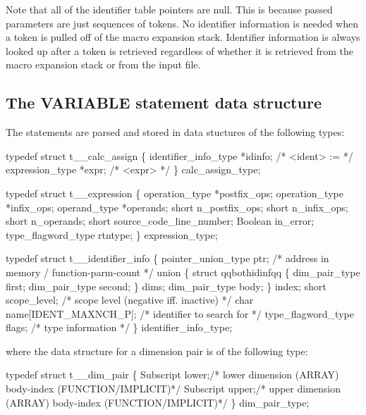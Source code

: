 Note that all of the identifier table pointers are null.  This is because
passed parameters are just sequences of tokens.   No identifier information
is needed when a token is pulled off of the macro expansion stack.
Identifier information is always looked up after a token is retrieved
regardless of whether it is retrieved from the macro expansion stack or from
the input file.


\subsection{The VARIABLE statement data structure}
\label{sec:calc}

The  statements are parsed and stored in data stuctures
of the following types:
\begin{codeexample}
typedef struct t__calc_assign
   \{
       identifier_info_type *idinfo;  /* <ident> := */
       expression_type *expr;         /*            <expr> */
   \} calc_assign_type;
\end{codeexample}

\begin{codeexample}
typedef struct t__expression
   \{
       operation_type *postfix_ops;
       operation_type *infix_ops;
       operand_type *operands;
       short n_postfix_ops;
       short n_infix_ops;
       short n_operands;
       short source_code_line_number;
       Boolean in_error;
       type_flagword_type rtntype;
   \} expression_type;
\end{codeexample}

\begin{codeexample}
typedef struct t__identifier_info
  \{
     pointer_union_type ptr;    /* address in memory / function-parm-count */
     union
        \{
           struct qqbothidinfqq
              \{
                 dim_pair_type first;
                 dim_pair_type second;
              \} dims;
           dim_pair_type body;
        \} index;
     short scope_level;         /* scope level (negative iff. inactive) */
     char name[IDENT_MAXNCH_P]; /* identifier to search for */
     type_flagword_type flags;  /* type information */
  \} identifier_info_type;
\end{codeexample}
where the data structure for a dimension pair is of the following type:
\begin{codeexample}
typedef struct t__dim_pair
  \{
    Subscript lower;/* lower dimension (ARRAY) body-index (FUNCTION/IMPLICIT)*/
    Subscript upper;/* upper dimension (ARRAY) body-index (FUNCTION/IMPLICIT)*/
  \} dim_pair_type;
\end{codeexample}

